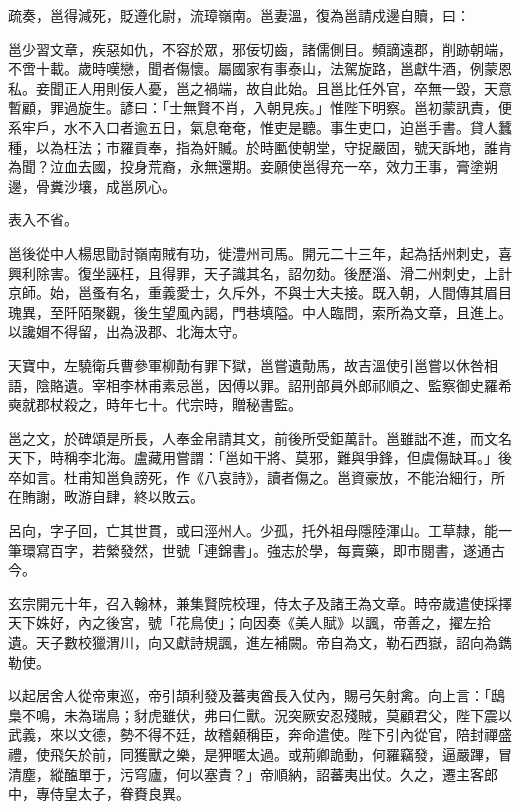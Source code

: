 \begin{pinyinscope}
 疏奏，邕得減死，貶遵化尉，流璋嶺南。邕妻溫，復為邕請戍邊自贖，曰：



 邕少習文章，疾惡如仇，不容於眾，邪佞切齒，諸儒側目。頻謫遠郡，削跡朝端，不啻十載。歲時嘆戀，聞者傷懷。屬國家有事泰山，法駕旋路，邕獻牛酒，例蒙恩私。妾聞正人用則佞人憂，邕之禍端，故自此始。且邕比任外官，卒無一毀，天意暫顧，罪過旋生。諺曰：「士無賢不肖，入朝見疾。」惟陛下明察。邕初蒙訊責，便系牢戶，水不入口者逾五日，氣息奄奄，惟吏是聽。事生吏口，迫邕手書。貸人蠶種，以為枉法；市羅貢奉，指為奸贓。於時匭使朝堂，守捉嚴固，號天訴地，誰肯為聞？泣血去國，投身荒裔，永無還期。妾願使邕得充一卒，效力王事，膏塗朔邊，骨糞沙壤，成邕夙心。



 表入不省。



 邕後從中人楊思勖討嶺南賊有功，徙澧州司馬。開元二十三年，起為括州刺史，喜興利除害。復坐誣枉，且得罪，天子識其名，詔勿劾。後歷淄、滑二州刺史，上計京師。始，邕蚤有名，重義愛士，久斥外，不與士大夫接。既入朝，人間傳其眉目瑰異，至阡陌聚觀，後生望風內謁，門巷填隘。中人臨問，索所為文章，且進上。以讒媢不得留，出為汲郡、北海太守。



 天寶中，左驍衛兵曹參軍柳勣有罪下獄，邕嘗遺勣馬，故吉溫使引邕嘗以休咎相語，陰賂遺。宰相李林甫素忌邕，因傅以罪。詔刑部員外郎祁順之、監察御史羅希奭就郡杖殺之，時年七十。代宗時，贈秘書監。



 邕之文，於碑頌是所長，人奉金帛請其文，前後所受鉅萬計。邕雖詘不進，而文名天下，時稱李北海。盧藏用嘗謂：「邕如干將、莫邪，難與爭鋒，但虞傷缺耳。」後卒如言。杜甫知邕負謗死，作《八哀詩》，讀者傷之。邕資豪放，不能治細行，所在賄謝，畋游自肆，終以敗云。



 呂向，字子回，亡其世貫，或曰涇州人。少孤，托外祖母隱陸渾山。工草隸，能一筆環寫百字，若縈發然，世號「連錦書」。強志於學，每賣藥，即市閱書，遂通古今。



 玄宗開元十年，召入翰林，兼集賢院校理，侍太子及諸王為文章。時帝歲遣使採擇天下姝好，內之後宮，號「花鳥使」；向因奏《美人賦》以諷，帝善之，擢左拾遺。天子數校獵渭川，向又獻詩規諷，進左補闕。帝自為文，勒石西嶽，詔向為鐫勒使。



 以起居舍人從帝東巡，帝引頡利發及蕃夷酋長入仗內，賜弓矢射禽。向上言：「鴟梟不鳴，未為瑞鳥；豺虎雖伏，弗曰仁獸。況突厥安忍殘賊，莫顧君父，陛下震以武義，來以文德，勢不得不廷，故稽顙稱臣，奔命遣使。陛下引內從官，陪封禪盛禮，使飛矢於前，同獲獸之樂，是狎暱太過。或荊卿詭動，何羅竊發，逼嚴蹕，冒清塵，縱醢單于，污穹廬，何以塞責？」帝順納，詔蕃夷出仗。久之，遷主客郎中，專侍皇太子，眷賚良異。




\end{pinyinscope}

